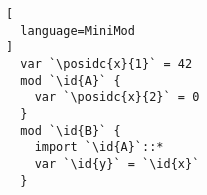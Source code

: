 \begin{lstlisting}[
  language=MiniMod
]
  var `\posidc{x}{1}` = 42
  mod `\id{A}` {
    var `\posidc{x}{2}` = 0
  }
  mod `\id{B}` {
    import `\id{A}`::*
    var `\id{y}` = `\id{x}`
  }
\end{lstlisting}
